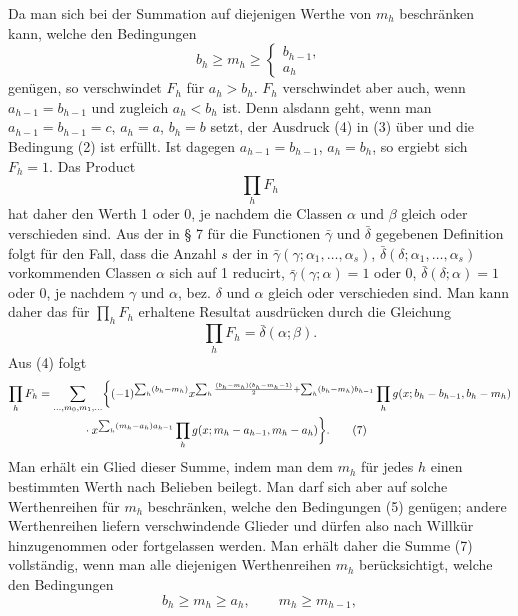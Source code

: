 Da man sich bei der Summation auf diejenigen Werthe von $m_h$ beschränken kann, welche den Bedingungen
\begin{equation}
 b_h\ge m_h\ge\begin{cases}b_{h-1},\\ a_h
 \end{cases}
\tag{5}
\end{equation}
genügen, so verschwindet $F_h$ für $a_h>b_h$. $F_h$ verschwindet aber auch, wenn $a_{h-1}=b_{h-1}$ und zugleich $a_h<b_h$ ist. Denn alsdann geht, wenn man $a_{h-1}=b_{h-1}=c$, $a_h=a$, $b_h=b$ setzt, der Ausdruck (4) in (3) über und die Bedingung (2) ist erfüllt. Ist dagegen $a_{h-1}=b_{h-1}$, $a_h=b_h$, so ergiebt sich $F_h=1$. Das Product
\[
 \prod_hF_h
\]
hat daher den Werth 1 oder 0, je nachdem die Classen $\alpha$ und $\beta$ gleich oder verschieden sind. Aus der in § 7 für die Functionen $\bar\gamma$ und $\bar\delta$ gegebenen Definition folgt für den Fall, dass die Anzahl $s$ der in $\bar\gamma(\gamma;\alpha_1,\ldots,\alpha_s)$, $\bar\delta(\delta;\alpha_1,
\ldots,\alpha_s)$ vorkommenden Classen $\alpha$ sich auf 1 reducirt, $\bar\gamma(\gamma;\alpha)=1$ oder $0$, $\bar\delta(\delta;\alpha)=1$ oder $0$, je nachdem $\gamma$ und $\alpha$, bez. $\delta$ und $\alpha$ gleich oder verschieden sind. Man kann daher das für $\prod_hF_h$ erhaltene Resultat ausdrücken durch die Gleichung
\begin{equation}
 \prod_hF_h=\bar\delta(\alpha;\beta).
\tag{6}
\end{equation}
Aus (4) folgt
\begin{align}
\prod_hF_h
&=\sum_{\ldots,m_0,m_1,\ldots}
\biggl\{(-1)^{\sum_h(b_h-m_h)}
 x^{\sum_h{(b_h-m_h)(b_h-m_h-1)\over2}+\sum_h(b_h-m_h)b_{h-1}}
 \prod_h g(x;b_h-b_{h-1},b_h-m_h)\notag\\
&\qquad\qquad\cdot
 x^{\sum_h(m_h-a_h)a_{h-1}}
 \prod_h g(x;m_h-a_{h-1},m_h-a_h)\biggr\}.
\tag{7}
\end{align}
Man erhält ein Glied dieser Summe, indem man dem $m_h$ für jedes $h$ einen bestimmten Werth nach Belieben beilegt. Man darf sich aber auf solche Werthenreihen für $m_h$ beschränken, welche den Bedingungen (5) genügen; andere Werthenreihen liefern verschwindende Glieder und dürfen also nach Willkür hinzugenommen oder fortgelassen werden. Man erhält daher die Summe (7) vollständig, wenn man alle diejenigen Werthenreihen $m_h$ berücksichtigt, welche den Bedingungen
\begin{equation}
 b_h\ge m_h\ge a_h,
 \qquad m_h\ge m_{h-1},
\tag{8}
\end{equation}
